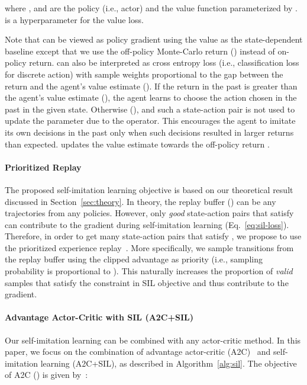 \documentclass{article}
\newcommand{\cutparagraphup}{\vspace*{-0.05in}}\newcommand{\cutparagraphdown}{\vspace*{-0.02in}}
\begin{document}
where , and  are the policy (i.e., actor) and the value function parameterized by .  is a hyperparameter for the value loss.

Note that  can be viewed as policy gradient using the value  as the state-dependent baseline except that we use the off-policy Monte-Carlo return () instead of on-policy return.  can also be interpreted as cross entropy loss (i.e., classification loss for discrete action) with sample weights proportional to the gap between the return and the agent's value estimate (). If the return in the past is greater than the agent's value estimate (), the agent learns to choose the action chosen in the past in the given state. Otherwise (), and such a state-action pair is not used to update the parameter due to the  operator. This encourages the agent to imitate its own decisions in the past only when such decisions resulted in larger returns than expected.  updates the value estimate towards the off-policy return . 

\paragraph{Prioritized Replay} The proposed self-imitation learning objective  is based on our theoretical result discussed in Section~\ref{sec:theory}. In theory, the replay buffer () can be any trajectories from any policies. However, only \textit{good} state-action pairs that satisfy  can contribute to the gradient during self-imitation learning (Eq.~\ref{eq:sil-loss}). Therefore, in order to get many state-action pairs that satisfy , we propose to use the prioritized experience replay~\citep{Schaul2015PrioritizedER}. More specifically, we sample transitions from the replay buffer using the clipped advantage  as priority (i.e., sampling probability is proportional to ). This naturally increases the proportion of \textit{valid} samples that satisfy the constraint  in SIL objective and thus contribute to the gradient. 

\cutparagraphup
\paragraph{Advantage Actor-Critic with SIL (A2C+SIL)} 
Our self-imitation learning can be combined with any actor-critic method. In this paper, we focus on the combination of advantage actor-critic (A2C)~\citep{mnih2016asynchronous}  and self-imitation learning (A2C+SIL), as described in Algorithm~\ref{alg:sil}. The objective of A2C () is given by~\citep{mnih2016asynchronous}:
\end{document}
